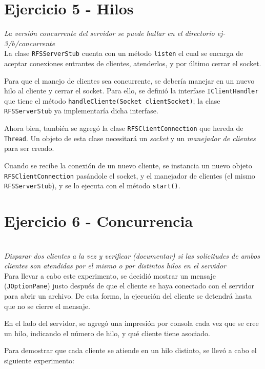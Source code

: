 \section{Ejercicio 5 - Hilos}

\emph{La versión concurrente del servidor se puede hallar en el directorio ej-3/b/concurrente} 
~\\

La clase \texttt{RFSServerStub} cuenta con un método \texttt{listen} el cual se encarga de aceptar conexiones entrantes de clientes, atenderlos, y por último cerrar el socket.

Para que el manejo de clientes sea concurrente, se debería manejar en un nuevo hilo al cliente y cerrar el socket. Para ello, se definió la interfase \texttt{IClientHandler} que tiene el método \texttt{handleCliente(Socket clientSocket)}; la clase \texttt{RFSServerStub} ya implementaría dicha interfase. 

Ahora bien, también se agregó la clase \texttt{RFSClientConnection} que hereda de \texttt{Thread}. Un objeto de esta clase necesitará un \emph{socket} y un \emph{manejador de clientes} para ser creado.   

Cuando se recibe la conexión de un nuevo cliente, se instancia un nuevo objeto \texttt{RFSClientConnection} pasándole el socket, y el manejador de clientes (el mismo \texttt{RFSServerStub}), y se lo ejecuta con el método \texttt{start()}.

\section{Ejercicio 6 - Concurrencia}

~\\
\emph{Disparar dos clientes a la vez y verificar (documentar) si las solicitudes de ambos clientes son atendidas por el mismo o por distintos hilos en el servidor} 
~\\

Para llevar a cabo este experimento, se decidió mostrar un mensaje (\texttt{JOptionPane}) justo después de que el cliente se haya conectado con el servidor para abrir un archivo. De esta forma, la ejecución del cliente se detendrá hasta que no se cierre el mensaje.

En el lado del servidor, se agregó una impresión por consola cada vez que se cree un hilo, indicando el número de hilo, y qué cliente tiene asociado.

Para demostrar que cada cliente se atiende en un hilo distinto, se llevó a cabo el siguiente experimento:

